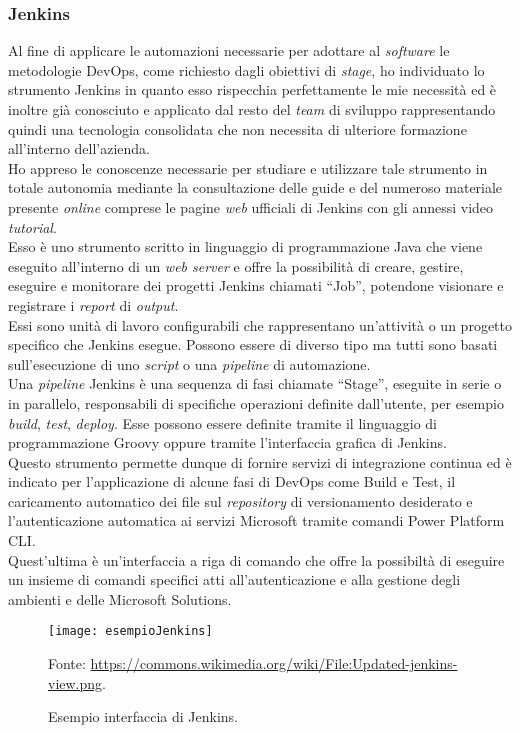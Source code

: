 \subsubsection*{Jenkins}
Al fine di applicare le automazioni necessarie per adottare al \emph{software} le metodologie \gls{DevOps}, come richiesto dagli obiettivi di \emph{stage}, ho individuato lo strumento Jenkins in quanto esso rispecchia perfettamente le mie necessità ed è inoltre già conosciuto e applicato dal resto del \emph{team} di sviluppo rappresentando quindi una tecnologia consolidata che non necessita di ulteriore formazione all'interno dell'azienda.\\
Ho appreso le conoscenze necessarie per studiare e utilizzare tale strumento in totale autonomia mediante la consultazione delle guide e del numeroso materiale presente \emph{online} comprese le pagine \emph{web} ufficiali di Jenkins con gli annessi video \emph{tutorial}.\\
Esso è uno strumento scritto in linguaggio di programmazione Java che viene eseguito all'interno di un \emph{web server} e offre la possibilità di creare, gestire, eseguire e monitorare dei progetti Jenkins chiamati “Job”, potendone visionare e registrare i \emph{report} di \emph{output}.\\
Essi sono unità di lavoro configurabili che rappresentano un'attività o un progetto specifico che Jenkins esegue. Possono essere di diverso tipo ma tutti sono basati sull'esecuzione di uno \emph{script} o una \emph{pipeline} di automazione.\\
Una \emph{pipeline} Jenkins è una sequenza di fasi chiamate “Stage”, eseguite in serie o in parallelo, responsabili di specifiche operazioni definite dall'utente, per esempio \emph{build}, \emph{test}, \emph{deploy}. Esse possono essere definite tramite il linguaggio di programmazione Groovy oppure tramite l'interfaccia grafica di Jenkins.\\
Questo strumento permette dunque di fornire servizi di integrazione continua ed è indicato per l'applicazione di alcune fasi di \gls{DevOps} come Build e Test, il caricamento automatico dei file sul \emph{repository} di versionamento desiderato e l'autenticazione automatica ai servizi Microsoft tramite comandi Power Platform CLI.\\
Quest'ultima è un'interfaccia a riga di comando che offre la possibiltà di eseguire un insieme di comandi specifici atti all'autenticazione e alla gestione degli ambienti e delle Microsoft Solutions.\\
\begin{figure}[htbp] 
    \centering 
    \texttt{[image: esempioJenkins]} 
    \caption{Esempio interfaccia di Jenkins.}
    \label{fig:esempioJenkins}
    \vspace{1mm}
    Fonte: \url{https://commons.wikimedia.org/wiki/File:Updated-jenkins-view.png}.
\end{figure}

